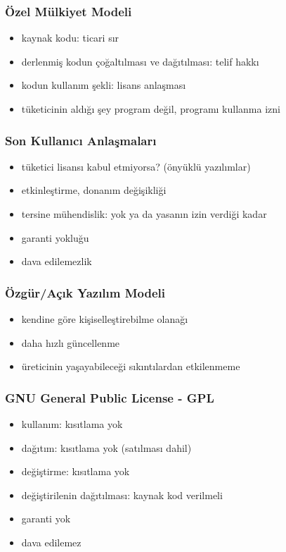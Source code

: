 \documentclass[dvipsnames]{beamer}
\theoremstyle{plain}
\begin{document}
\begin{frame}
  \frametitle{Özel Mülkiyet Modeli}

  \begin{itemize}
    \item kaynak kodu: ticari sır
    \item derlenmiş kodun çoğaltılması ve dağıtılması: telif hakkı
    \item kodun kullanım şekli: lisans anlaşması

    \pause
    \medskip
    \item tüketicinin aldığı şey program değil, programı kullanma \alert{izni}
  \end{itemize}
\end{frame}

\begin{frame}
  \frametitle{Son Kullanıcı Anlaşmaları}

  \begin{itemize}
    \item tüketici lisansı kabul etmiyorsa? (önyüklü yazılımlar)
    \item etkinleştirme, donanım değişikliği
    \item tersine mühendislik: yok ya da yasanın izin verdiği kadar
    \item garanti yokluğu
    \item dava edilemezlik
  \end{itemize}
\end{frame}

\begin{frame}
  \frametitle{Özgür/Açık Yazılım Modeli}

  \begin{itemize}
    \item kendine göre kişiselleştirebilme olanağı
    \item daha hızlı güncellenme
    \item üreticinin yaşayabileceği sıkıntılardan etkilenmeme
  \end{itemize}
\end{frame}

\begin{frame}
  \frametitle{GNU General Public License - GPL}

  \begin{itemize}
    \item kullanım: kısıtlama yok
    \item dağıtım: kısıtlama yok (satılması dahil)
    \item değiştirme: kısıtlama yok
    \item değiştirilenin dağıtılması: kaynak kod verilmeli
    \item garanti yok
    \item dava edilemez
  \end{itemize}
\end{frame}
\end{document}
